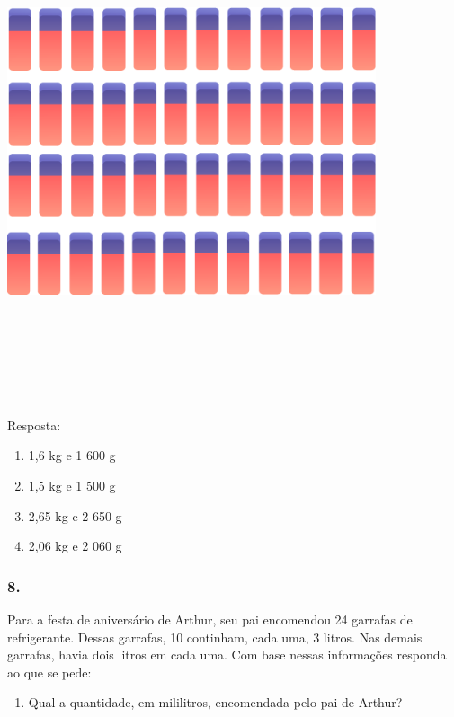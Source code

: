 \includegraphics[width=4.27464in,height=5.78333in]{media/image55.png}

Resposta:

\begin{enumerate}
\def\labelenumi{\alph{enumi})}
\item
  1,6 kg e 1 600 g
\item
  1,5 kg e 1 500 g
\item
  2,65 kg e 2 650 g
\item
  2,06 kg e 2 060 g
\end{enumerate}

\subsubsection{8.}\label{section-46}

Para a festa de aniversário de Arthur, seu pai encomendou 24 garrafas de
refrigerante. Dessas garrafas, 10 continham, cada uma, 3 litros. Nas
demais garrafas, havia dois litros em cada uma. Com base nessas
informações responda ao que se pede:

\begin{enumerate}
\def\labelenumi{\alph{enumi})}
\item
  Qual a quantidade, em mililitros, encomendada pelo pai de Arthur?
\end{enumerate}

